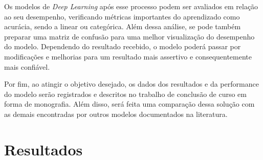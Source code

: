 Os modelos de \emph{Deep Learning} após esse processo podem ser avaliados em relação ao seu desempenho, verificando métricas importantes do aprendizado como acurácia, sendo a linear ou categórica. Além dessa análise, se pode também preparar uma matriz de confusão para uma melhor visualização do desempenho do modelo. Dependendo do resultado recebido, o modelo poderá passar por modificações e melhorias para um resultado mais assertivo e consequentemente mais confiável.

Por fim, ao atingir o objetivo desejado, os dados dos resultados e da performance do modelo serão registrados e descritos no trabalho de conclusão de curso em forma de monografia. Além disso, será feita uma comparação dessa solução com as demais encontradas por outros modelos documentados na literatura.

\chapter{Resultados}
\label{chap:resultados}

